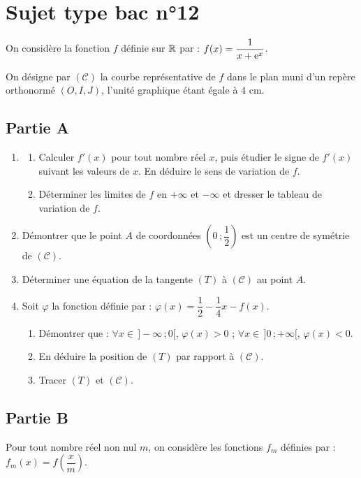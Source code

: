 \section*{Sujet type bac n°12}

On considère la fonction $f$ définie sur $\mathbb{R}$ par : $f(x)=\dfrac{1}{x+\mathrm{e}^x}$.

On désigne par $(\mathscr{C})$ la courbe représentative de $f$ dans le plan muni d'un repère orthonormé $(O,I,J)$, l'unité graphique étant égale à $4$ cm.

\subsection*{Partie A}

\begin{enumerate}
	\item
	\begin{enumerate}
		\item Calculer $f'(x)$ pour tout nombre réel $x$, puis étudier le signe de $f'(x)$ suivant les valeurs de $x$. En déduire le sens de variation de $f$.
		\item Déterminer les limites de $f$ en $+\infty$ et $-\infty$ et dresser le tableau de variation de $f$.
	\end{enumerate}
	\item Démontrer que le point $A$ de coordonnées $\left(0\,;\dfrac12\right)$ est un centre de symétrie de $(\mathscr{C})$.
	\item Déterminer une équation de la tangente $(T)$ à $(\mathscr{C})$ au point $A$.
	\item Soit $\varphi$ la fonction définie par : $\varphi(x)=\dfrac12-\dfrac14 x-f(x)$.
	\begin{enumerate}
		\item Démontrer que : $\forall x\in\,]-\infty\,;0[$, $\varphi(x)>0$ ; $\forall x\in\,]0\,;+\infty[$, $\varphi(x)<0$.
		\item En déduire la position de $(T)$ par rapport à $(\mathscr{C})$.
		\item Tracer $(T)$ et $(\mathscr{C})$.
	\end{enumerate}
\end{enumerate}

\subsection*{Partie B}

Pour tout nombre réel non nul $m$, on considère les fonctions $f_m$ définies par : $f_m(x)=f\!\left(\dfrac{x}{m}\right)$.

